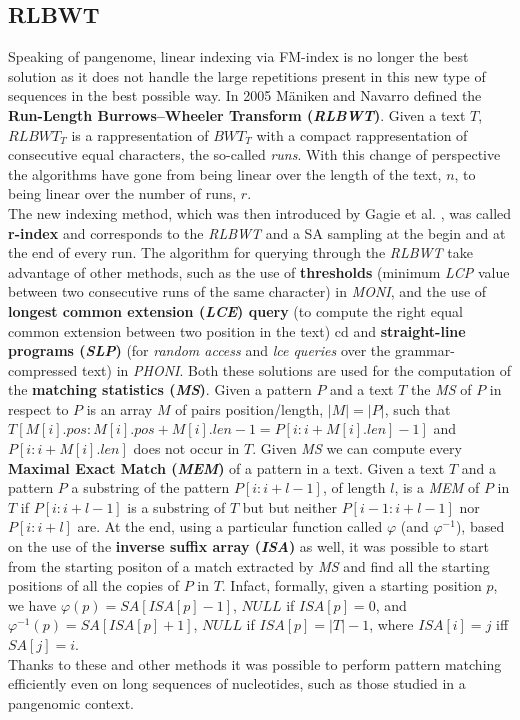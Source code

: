 \documentclass[a4paper,11pt, oneside]{article}
\begin{document}
\subsection*{RLBWT}
Speaking of pangenome, linear indexing via FM-index is no longer the best
solution as it does not handle the large repetitions present in this new type of
sequences in the best possible way. In 2005 M\"{a}niken and Navarro defined
the \textbf{Run-Length Burrows–Wheeler Transform (\textit{RLBWT})}. Given a text
$T$, $RLBWT_T$ is a rappresentation of $BWT_T$ with a compact rappresentation of
consecutive equal characters, the so-called \textit{runs}. With this change of
perspective the algorithms have gone from being linear over the length of the
text, $n$, to being linear over the number of runs, $r$. \\
The new indexing method, which was then introduced by Gagie et
al. \cite{rindex}, was called \textbf{r-index} and corresponds to the
\textit{RLBWT} and a SA sampling at the begin and at the end of every run. The
algorithm for querying through the \textit{RLBWT} take advantage of other
methods, such as the use of \textbf{thresholds} (minimum
\textit{LCP} value between two consecutive runs of the same character) in
\textit{MONI}, and the use of \textbf{longest common extension (\textit{LCE})
  query} (to compute the right equal common extension between two position in
the text) cd\cite{lce} and \textbf{straight-line programs (\textit{SLP})}
\cite{slp} (for \textit{random access} and \textit{lce queries} over the
grammar-compressed text) in \textit{PHONI}. Both these solutions are used for
the computation of the \textbf{matching statistics (\textit{MS})}. Given a
pattern $P$ and a text $T$ the \textit{MS} of $P$ in respect to $P$ is an array
$M$ of pairs position/length, $|M|=|P|$, such that
$T[M[i].pos:M[i].pos+M[i].len-1=P[i:i+M[i].len]-1]$ and $P[i:i+M[i].len]$ does
not occur in $T$. Given \textit{MS} we can compute every \textbf{Maximal Exact
  Match (\textit{MEM})} of a pattern in a text. Given a text $T$ and a pattern
$P$ a substring of the pattern $P[i : i+l-1]$, of length $l$, is a \textit{MEM}
of $P$ in $T$ if $P[i:i+l-1]$ is a substring of $T$ but but neither
$P[i-1:i+l-1]$ nor $P[i:i+l]$ are. At the end, using a particular function
called $\varphi$ (and $\varphi^{-1}$), based on the use of the \textbf{inverse
  suffix array (\textit{ISA})} as well, it was possible to start from the
starting positon of a match extracted 
by \textit{MS} and find all the starting positions of all the copies of $P$ in
$T$. Infact, formally, given a starting position $p$, we have
$\varphi(p)=SA[ISA[p]-1]$, $NULL$ if $ISA[p]=0$, and
$\varphi^{-1}(p)=SA[ISA[p]+1]$, $NULL$ if $ISA[p]=|T|-1$, where $ISA[i]=j$ iff
$SA[j]=i$.\\   
Thanks to these and other methods it was possible to perform pattern matching
efficiently even on long sequences of nucleotides, such as those studied in
a pangenomic context. 
\end{document}
